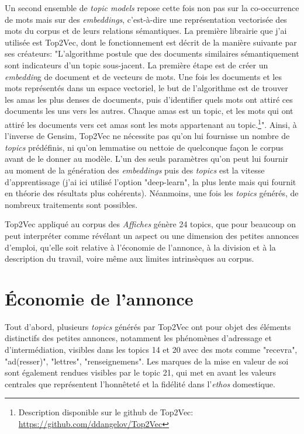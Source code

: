 Un second ensemble de \textit{topic models} repose cette fois non pas sur la co-occurrence de mots mais sur des \textit{embeddings}, c'est-à-dire une représentation vectorisée des mots du corpus et de leurs relations sémantiques. La première librairie que j'ai utilisée est Top2Vec, dont le fonctionnement est décrit de la manière suivante par ses créateurs: "L'algorithme postule que des documents similaires sémantiquement sont indicateurs d'un topic sous-jacent. La première étape est de créer un \textit{embeddin}g de document et de vecteurs de mots. Une fois les documents et les mots représentés dans un espace vectoriel, le but de l'algorithme est de trouver les amas les plus denses de documents, puis d'identifier quels mots ont attiré ces documents les uns vers les autres. Chaque amas est un topic, et les mots qui ont attiré les documents vers cet amas sont les mots appartenant au topic.\footnote{Description disponible sur le github de Top2Vec: \url{https://github.com/ddangelov/Top2Vec}}".
Ainsi, à l'inverse de Gensim, Top2Vec ne nécessite pas qu'on lui fournisse un nombre de\textit{ topics} prédéfinis, ni qu'on lemmatise ou nettoie de quelconque façon le corpus avant de le donner au modèle. L'un des seuls paramètres qu'on peut lui fournir au moment de la génération des \textit{embeddings} puis des \textit{topics} est la vitesse d'apprentissage (j'ai ici utilisé l'option "deep-learn", la plus lente mais qui fournit en théorie des résultats plus cohérents). Néanmoins, une fois les \textit{topics} générés, de nombreux traitements sont possibles.

Top2Vec appliqué au corpus des \textit{Affiches} génère 24 topics, que pour beaucoup on peut interpréter comme révélant un aspect ou une dimension des petites annonces d'emploi, qu'elle soit relative à l'économie de l'annonce, à la division et à la description du travail, voire même aux limites intrinsèques au corpus. 


\section{Économie de l'annonce}

Tout d'abord, plusieurs \textit{topics} générés par Top2Vec ont pour objet des éléments distinctifs des petites annonces, notamment les phénomènes d'adressage et d'intermédiation, visibles dans les topics 14 et 20 avec des mots comme "recevra", "ad(resser)", "lettres", "renseignemens". Les marques de la mise en valeur de soi sont également rendues visibles par le topic 21, qui met en avant les valeurs centrales que représentent l'honnêteté et la fidélité dans l'\textit{ethos} domestique.

